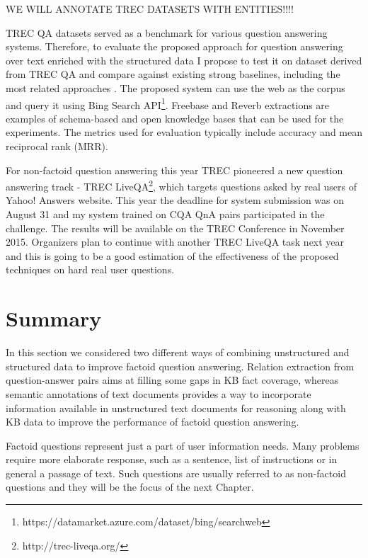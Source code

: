 WE WILL ANNOTATE TREC DATASETS WITH ENTITIES!!!!

TREC QA datasets served as a benchmark for various question answering systems.
Therefore, to evaluate the proposed approach for question answering over text enriched with the structured data I propose to test it on dataset derived from TREC QA and compare against existing strong baselines, including the most related approaches \cite{Fader:2014:OQA:2623330.2623677,Sun:2015:ODQ:2736277.2741651}.
The proposed system can use the web as the corpus and query it using Bing Search API\footnote{https://datamarket.azure.com/dataset/bing/searchweb}.
Freebase and Reverb extractions \cite{FaderSE11} are examples of schema-based and open knowledge bases that can be used for the experiments.
The metrics used for evaluation typically include accuracy and mean reciprocal rank (MRR).

For non-factoid question answering this year TREC pioneered a new question answering track - TREC LiveQA\footnote{http://trec-liveqa.org/}, which targets questions asked by real users of Yahoo! Answers website.
This year the deadline for system submission was on August 31 and my system trained on CQA QnA pairs participated in the challenge.
The results will be available on the TREC Conference in November 2015.
Organizers plan to continue with another TREC LiveQA task next year and this is going to be a good estimation of the effectiveness of the proposed techniques on hard real user questions.


\section{Summary}
In this section we considered two different ways of combining unstructured and structured data to improve factoid question answering.
Relation extraction from question-answer pairs aims at filling some gaps in KB fact coverage, whereas semantic annotations of text documents provides a way to incorporate information available in unstructured text documents for reasoning along with KB data to improve the performance of factoid question answering.

Factoid questions represent just a part of user information needs. Many problems require more elaborate response, such as a sentence, list of instructions or in general a passage of text.
Such questions are usually referred to as non-factoid questions and they will be the focus of the next Chapter.

\clearpage